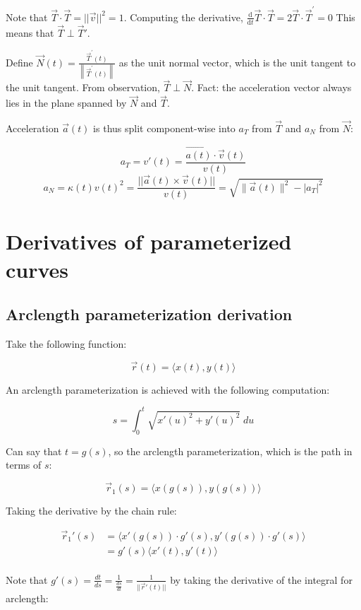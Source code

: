 Note that $\vec{T}\cdot \vec{T}=||\vec{v}||^2=1$.
Computing the derivative, $\frac{\mathrm{d}}{\mathrm{d} t} \vec{T} \cdot \vec{T}=2 \vec{T} \cdot \vec{T}^{\prime}=0$
This means that $\vec{T}\perp \vec{T}'$.\newline

\noindent
Define $\boxed{\vec{N}(t)=\frac{\vec{T}^{\prime}(t)}{\left\|\vec{T}^{\prime}(t)\right\|}}$ as
the unit normal vector, which is the unit tangent to the unit tangent. From observation, $\vec{T}\perp \vec{N}$.
Fact: the acceleration vector always lies in the plane spanned by $\vec{N}$ and $\vec{T}$.\newline

\noindent
Acceleration $\vec{a}(t)$ is thus split component-wise into $a_T$ from $\vec{T}$
and $a_N$ from $\vec{N}$:

\[\boxed{a_T=v'(t)=\frac{\vec{a(t)}\cdot \vec{v}(t)}{v(t)}}\]
\[\boxed{a_N=\kappa(t)v(t)^2=\frac{||\vec{a}(t)\times \vec{v}(t)||}{v(t)}=\sqrt{\|\vec{a}(t)\|^{2}-\left|a_{T}\right|^{2}}}\]

\section{Derivatives of parameterized curves}

\subsection{Arclength parameterization derivation}

Take the following function:

\[\vec{r}(t)=\langle x(t),y(t) \rangle\]

An arclength parameterization is achieved with the following computation:

\[s=\int_0^t \sqrt{x'(u)^2+y'(u)^2}\;du\]

Can say that $t=g(s)$, so the arclength parameterization, which is the path in terms of $s$:

\[\vec{r}_1(s)=\langle x(g(s)),y(g(s))\rangle\]

Taking the derivative by the chain rule:

\begin{align*}
    \vec{r}_1'(s)&=\langle x'(g(s))\cdot g'(s),y'(g(s))\cdot g'(s)\rangle \\
    &=g'(s)\langle x'(t),y'(t) \rangle \\
\end{align*}

Note that $g'(s)=\frac{dt}{ds}=\frac{1}{\frac{ds}{dt}}=\frac{1}{||\vec{r}'(t)||}$ by taking the derivative of the integral for arclength:

